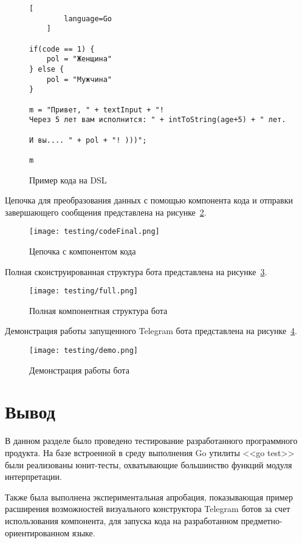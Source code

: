 \begin{figure}[ht]
	\centering
	\vspace{\toppaddingoffigure}
	\begin{lstlisting}[
        language=Go
    ]

if(code == 1) {
    pol = "Женщина"
} else {
    pol = "Мужчина"
}

m = "Привет, " + textInput + "!
Через 5 лет вам исполнится: " + intToString(age+5) + " лет.

И вы.... " + pol + "! )))";

m
\end{lstlisting}
	\caption{Пример кода на DSL}
	\label{f:experiment_code}
\end{figure}

Цепочка для преобразования данных с помощью компонента кода и отправки завершающего сообщения представлена на рисунке~\ref{f:experimentСodeFinal}.

\begin{figure}[ht]
	\centering
	\vspace{\toppaddingoffigure}
	\texttt{[image: testing/codeFinal.png]}
	\caption{Цепочка с компонентом кода}
	\label{f:experimentСodeFinal}
\end{figure}

Полная сконструированная структура бота представлена на рисунке~\ref{f:experimentFull}.

\clearpage

\begin{figure}[!ht]
	\centering
	\vspace{\toppaddingoffigure}
	\texttt{[image: testing/full.png]}
	\caption{Полная компонентная структура бота}
	\label{f:experimentFull}
\end{figure}

Демонстрация работы запущенного Telegram бота представлена на рисунке~\ref{f:experimentDemo}.

\begin{figure}[!ht]
	\centering
	\texttt{[image: testing/demo.png]}
	\caption{Демонстрация работы бота}
	\label{f:experimentDemo}
\end{figure}

\section*{Вывод}
В данном разделе было проведено тестирование разработанного программного продукта.
На базе встроенной в среду выполнения Go утилиты <<go test>> были реализованы юнит-тесты, охватывающие большинство функций модуля интерпретации.

Также была выполнена экспериментальная апробация, показывающая пример расширения возможностей визуального конструктора Telegram ботов
за счет использования компонента, для запуска кода на разработанном предметно-ориентированном языке.
\clearpage

